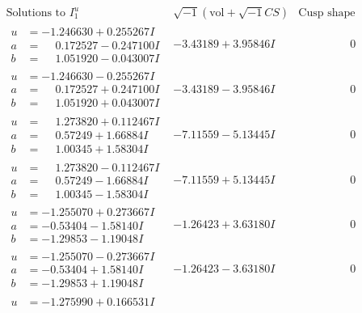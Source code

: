 \documentclass[1p]{elsarticle_modified}
\theoremstyle{definition}
\newcommand{\I}{\sqrt{-1}}
\begin{document}
$$\begin{array}{c|c|c}
\text{Solutions to }I^u_{1}& \I (\text{vol} + \sqrt{-1}CS) & \text{Cusp shape}\\
 \hline 
\begin{aligned}
u &= -1.246630 + 0.255267 I \\
a &= \phantom{-}0.172527 - 0.247100 I \\
b &= \phantom{-}1.051920 - 0.043007 I\end{aligned}
 & -3.43189 + 3.95846 I & \phantom{-0.000000 } 0 \\ \hline\begin{aligned}
u &= -1.246630 - 0.255267 I \\
a &= \phantom{-}0.172527 + 0.247100 I \\
b &= \phantom{-}1.051920 + 0.043007 I\end{aligned}
 & -3.43189 - 3.95846 I & \phantom{-0.000000 } 0 \\ \hline\begin{aligned}
u &= \phantom{-}1.273820 + 0.112467 I \\
a &= \phantom{-}0.57249 + 1.66884 I \\
b &= \phantom{-}1.00345 + 1.58304 I\end{aligned}
 & -7.11559 - 5.13445 I & \phantom{-0.000000 } 0 \\ \hline\begin{aligned}
u &= \phantom{-}1.273820 - 0.112467 I \\
a &= \phantom{-}0.57249 - 1.66884 I \\
b &= \phantom{-}1.00345 - 1.58304 I\end{aligned}
 & -7.11559 + 5.13445 I & \phantom{-0.000000 } 0 \\ \hline\begin{aligned}
u &= -1.255070 + 0.273667 I \\
a &= -0.53404 - 1.58140 I \\
b &= -1.29853 - 1.19048 I\end{aligned}
 & -1.26423 + 3.63180 I & \phantom{-0.000000 } 0 \\ \hline\begin{aligned}
u &= -1.255070 - 0.273667 I \\
a &= -0.53404 + 1.58140 I \\
b &= -1.29853 + 1.19048 I\end{aligned}
 & -1.26423 - 3.63180 I & \phantom{-0.000000 } 0 \\ \hline\begin{aligned}
u &= -1.275990 + 0.166531 I \\

\end{aligned}
\end{array}$$
\end{document}
